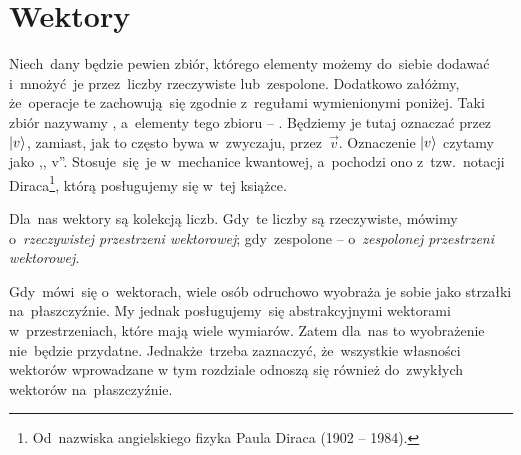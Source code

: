 \section{Wektory}
Niech~dany będzie pewien zbiór, którego elementy możemy do~siebie dodawać i~mnożyć~je
przez~liczby rzeczywiste lub~zespolone.
Dodatkowo załóżmy, że~operacje te zachowują~się zgodnie z~regułami wymienionymi
poniżej. Taki zbiór nazywamy , a~elementy tego zbioru -- .
Będziemy je tutaj oznaczać przez~$\ket{v}$, zamiast, jak to często bywa w~zwyczaju,
przez~$\vec{v}$. Oznaczenie $\ket{v}$ czytamy jako ,, v''.
Stosuje~się~je w~mechanice kwantowej,
a~pochodzi ono z~tzw.~notacji Diraca\footnote{Od~nazwiska angielskiego
	fizyka Paula Diraca (1902 -- 1984).}, którą posługujemy się w~tej książce.

Dla~nas wektory są kolekcją liczb. Gdy~te liczby są rzeczywiste, mówimy o~\emph{rzeczywistej przestrzeni wektorowej};
gdy~zespolone -- o~\emph{zespolonej przestrzeni wektorowej}.

Gdy~mówi~się o~wektorach, wiele osób odruchowo wyobraża je sobie jako strzałki
na~płaszczyźnie. My jednak posługujemy~się abstrakcyjnymi wektorami
w~przestrzeniach, które mają wiele wymiarów. Zatem dla~nas to wyobrażenie nie~będzie przydatne.
Jednakże~trzeba zaznaczyć, że~wszystkie własności wektorów wprowadzane w tym rozdziale odnoszą się również do~zwykłych wektorów na~płaszczyźnie.

